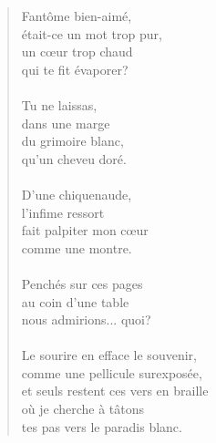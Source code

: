 \documentclass[11pt,a4paper]{book}
\begin{document}
\begin{verse}
  Fantôme bien-aimé, \\
  était-ce un mot trop pur, \\
  un c{\oe}ur trop chaud \\
  qui te fit évaporer? \\
  \ \\
  Tu ne laissas, \\
  dans une marge \\
  du grimoire blanc, \\
  qu'un cheveu doré. \\
  \ \\
  D'une chiquenaude, \\
  l'infime ressort \\
  fait palpiter mon c{\oe}ur \\
  comme une montre. \\%
  \ \\
  Penchés sur ces pages \\
  au coin d'une table \\
  nous admirions... quoi? \\
  \ \\
  Le sourire en efface le souvenir, \\
  comme une pellicule surexposée, \\
  et seuls restent ces vers en braille \\
  où je cherche à tâtons \\
  tes pas vers le paradis blanc.
\end{verse}

\newpage


\settowidth{\versewidth}{qui te transfigurent,}

\bigskip
\end{document}
